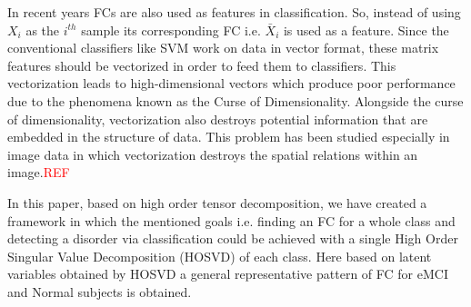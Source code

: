 \documentclass[journal]{IEEEtran}
\begin{document}
	In recent years FCs are also used as features in classification. 
		So, instead of using $X_i$ as the $i^{th}$ sample its corresponding  FC i.e. $\bar{X}_i$ is used as a feature.
		Since the conventional classifiers like SVM work on data in vector format, these matrix features should be vectorized in order to feed them to classifiers.
		This vectorization leads to high-dimensional vectors which produce poor performance due to the phenomena known as the Curse of Dimensionality. 
		Alongside the curse of dimensionality, vectorization also destroys potential information that are embedded in the structure of data. 
		This problem has been studied especially in image data in which vectorization destroys the spatial relations within an image.\textcolor{red}{REF}		


	
	
	In this paper, based on high order tensor decomposition, we have created a framework in which the mentioned goals i.e. finding an FC for a whole class and detecting a disorder via classification could be achieved with a single High Order Singular Value Decomposition (HOSVD) of each class.
	Here based on latent variables obtained by HOSVD a general representative pattern of FC for eMCI and Normal subjects is obtained. 
	
\end{document}
